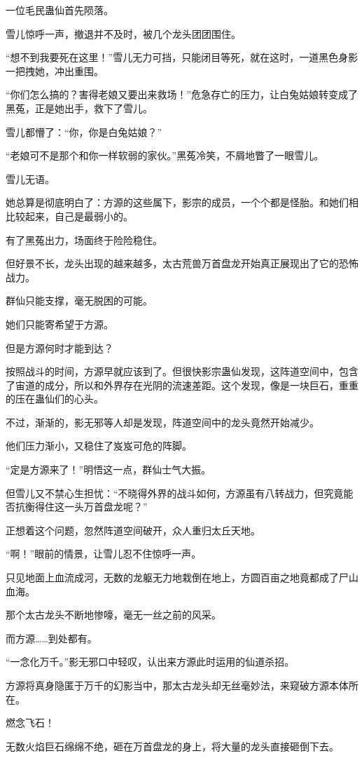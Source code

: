 \begin{this_body}
一位毛民蛊仙首先陨落。

雪儿惊呼一声，撤退并不及时，被几个龙头团团围住。

“想不到我要死在这里！”雪儿无力可挡，只能闭目等死，就在这时，一道黑色身影一把拽她，冲出重围。

“你们怎么搞的？害得老娘又要出来救场！”危急存亡的压力，让白兔姑娘转变成了黑菟，正是她出手，救下了雪儿。

雪儿都懵了：“你，你是白兔姑娘？”

“老娘可不是那个和你一样软弱的家伙。”黑菟冷笑，不屑地瞥了一眼雪儿。

雪儿无语。

她总算是彻底明白了：方源的这些属下，影宗的成员，一个个都是怪胎。和她们相比较起来，自己是最弱小的。

有了黑菟出力，场面终于险险稳住。

但好景不长，龙头出现的越来越多，太古荒兽万首盘龙开始真正展现出了它的恐怖战力。

群仙只能支撑，毫无脱困的可能。

她们只能寄希望于方源。

但是方源何时才能到达？

按照战斗的时间，方源早就应该到了。但很快影宗蛊仙发现，这阵道空间中，包含了宙道的成分，所以和外界存在光阴的流速差距。这个发现，像是一块巨石，重重的压在蛊仙们的心头。

不过，渐渐的，影无邪等人却是发现，阵道空间中的龙头竟然开始减少。

他们压力渐小，又稳住了岌岌可危的阵脚。

“定是方源来了！”明悟这一点，群仙士气大振。

但雪儿又不禁心生担忧：“不晓得外界的战斗如何，方源虽有八转战力，但究竟能否抗衡得住这一头万首盘龙呢？”

正想着这个问题，忽然阵道空间破开，众人重归太丘天地。

“啊！”眼前的情景，让雪儿忍不住惊呼一声。

只见地面上血流成河，无数的龙躯无力地栽倒在地上，方圆百亩之地竟都成了尸山血海。

那个太古龙头不断地惨嚎，毫无一丝之前的风采。

而方源……到处都有。

“一念化万千。”影无邪口中轻叹，认出来方源此时运用的仙道杀招。

方源将真身隐匿于万千的幻影当中，那太古龙头却无丝毫妙法，来窥破方源本体所在。

燃念飞石！

无数火焰巨石绵绵不绝，砸在万首盘龙的身上，将大量的龙头直接砸倒下去。


\end{this_body}
